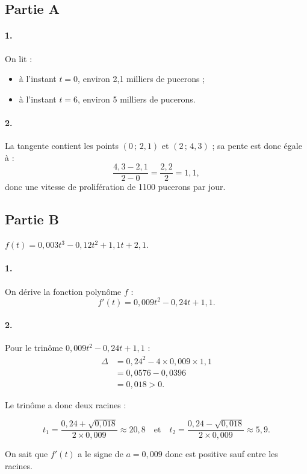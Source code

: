 \subsection*{Partie A}

\paragraph{1.}
On lit :
\begin{itemize}
    \item à l'instant \( t = 0 \), environ 2{,}1 milliers de pucerons ;
    \item à l'instant \( t = 6 \), environ 5 milliers de pucerons.
\end{itemize}

\paragraph{2.}
La tangente contient les points \( (0\,;\,2{,}1) \) et \( (2\,;\,4{,}3) \) ; sa pente est donc égale à :
\[
\dfrac{4{,}3 - 2{,}1}{2 - 0} = \dfrac{2{,}2}{2} = 1{,}1,
\]
donc une vitesse de prolifération de 1100 pucerons par jour.

\subsection*{Partie B}

\(f(t) = 0{,}003t^3 - 0{,}12t^2 + 1{,}1t + 2{,}1\).

\paragraph{1.}
On dérive la fonction polynôme \( f \) :
\[
f'(t) = 0{,}009t^2 - 0{,}24t + 1{,}1.
\]

\paragraph{2.}
Pour le trinôme \( 0{,}009t^2 - 0{,}24t + 1{,}1 \) :
\begin{align*}
\Delta &= 0{,}24^2 - 4 \times 0{,}009 \times 1{,}1 \\
&= 0{,}0576 - 0{,}0396 \\
&= 0{,}018 > 0.
\end{align*}

Le trinôme a donc deux racines :

\[
t_1 = \dfrac{0{,}24 + \sqrt{0{,}018}}{2 \times 0{,}009} \approx 20{,}8 \quad \text{et} \quad t_2 = \dfrac{0{,}24 - \sqrt{0{,}018}}{2 \times 0{,}009} \approx 5{,}9.
\]

On sait que \( f'(t) \) a le signe de \( a = 0{,}009 \) donc est positive sauf entre les racines.
